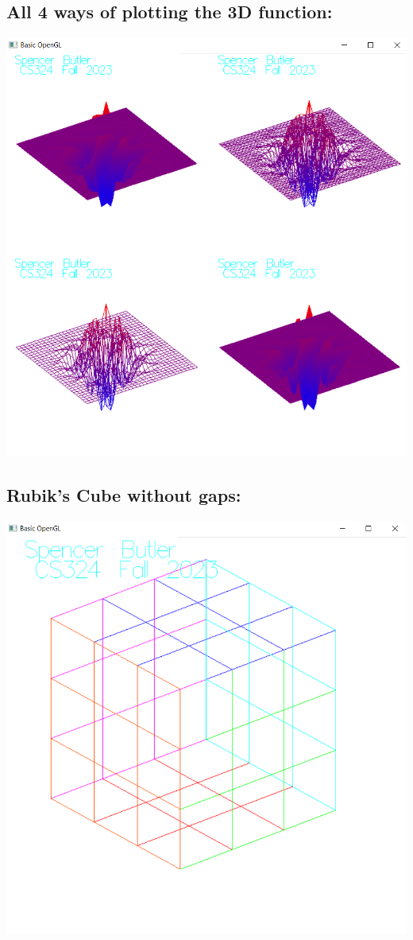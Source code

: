 \documentclass[12pt]{article}
\begin{document}
\subsection{All 4 ways of plotting the 3D function:}
\noindent \includegraphics{screens/quadrants}
\subsection{Rubik's Cube without gaps:}
\noindent \includegraphics{screens/cube}
\end{document}

